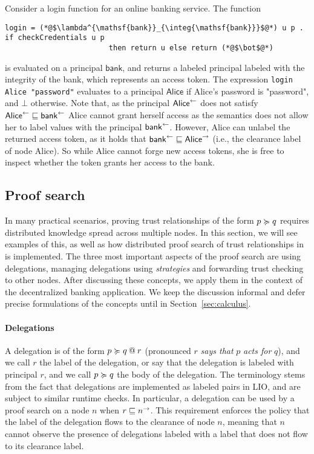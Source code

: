 Consider a login function for an online banking service. The function
\begin{lstlisting}
login = (*@$\lambda^{\mathsf{bank}}_{\integ{\mathsf{bank}}}$@*) u p . if checkCredentials u p
                        then return u else return (*@$\bot$@*)
\end{lstlisting}
is evaluated on a principal $\mathsf{bank}$, and returns a labeled principal labeled with the integrity of the bank, which represents an access token. The expression \lstinline[mathescape]!login Alice "password"! evaluates to a principal $\mathsf{Alice}$ if Alice's password is "password", and $\bot$ otherwise. Note that, as the principal $\integ{\mathsf{Alice}}$ does not satisfy $\integ{\mathsf{Alice}} \flowsto \integ{\mathsf{bank}}$ Alice cannot grant herself access as the semantics does not allow her to label values with the principal $\integ{\mathsf{bank}}$.
However, Alice can unlabel the returned access token, as it holds that $\integ{\mathsf{bank}} \flowsto \conf{\mathsf{Alice}}$ (i.e., the clearance label of node Alice). So while Alice cannot forge new access tokens, she is free to inspect whether the token grants her access to the bank.

\subsection{Proof search}
In many practical scenarios, proving trust relationships of the form $p \actsfor q$ requires distributed knowledge spread across multiple nodes. In this section, we will see examples of this, as well as how distributed proof search of trust relationships in \lang{} is implemented. The three most important aspects of the proof search are using delegations, managing delegations using \emph{strategies} and forwarding trust checking to other nodes. After discussing these concepts, we apply them in the context of the decentralized banking application. We keep the discussion informal and defer precise formulations of the concepts until in Section~\ref{sec:calculus}.

\paragraph{Delegations}
A delegation is of the form $\lb{r}{p \actsfor q}$ (pronounced $r$ \emph{says that} $p$ \emph{acts for} $q$), and we call $r$ the label of the delegation, or say that the delegation is labeled with principal $r$, and we call $p \actsfor q$ the body of the delegation. The terminology stems from the fact that delegations are implemented as labeled pairs in LIO, and are subject to similar runtime checks. In particular, a delegation can be used by a proof search on a node $n$ when $r \flowsto \conf{n}$. This requirement enforces the policy that the label of the delegation flows to the clearance of node $n$, meaning that $n$ cannot observe the presence of delegations labeled with a label that does not flow to its clearance label.

